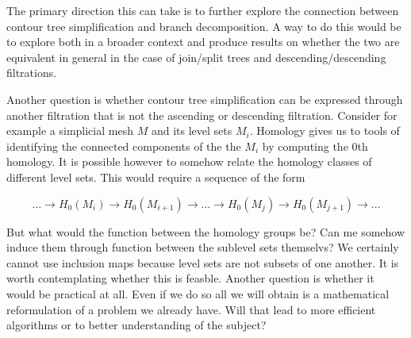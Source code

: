 
The primary direction this can take is to further explore the connection between contour tree simplification and branch decomposition. A way to do this would be to explore both in a broader context and produce results on whether the two are equivalent in general in the case of join/split trees and descending/descending filtrations.

Another question is whether contour tree simplification can be expressed through another filtration that is not the ascending or descending filtration. Consider for example a simplicial mesh $M$ and its level sets $M_i$. Homology gives us to tools of identifying the connected components of the the $M_i$ by computing the 0th homology. It is possible however to somehow relate the homology classes of different level sets. This would require a sequence of the form

$$ ... \rightarrow H_0(M_i) \rightarrow H_0(M_{i+1}) \rightarrow ... \rightarrow H_0(M_{j}) \rightarrow H_0(M_{j+1}) \rightarrow ...$$

But what would the function between the homology groups be? Can me somehow induce them through function between the sublevel sets themselvs? We certainly cannot use inclusion maps because level sets are not subsets of one another. It is worth contemplating whether this is feasble. Another question is whether it would be practical at all. Even if we do so all we will obtain is a mathematical reformulation of a problem we already have. Will that lead to more efficient algorithms or to better understanding of the subject?

%
%
